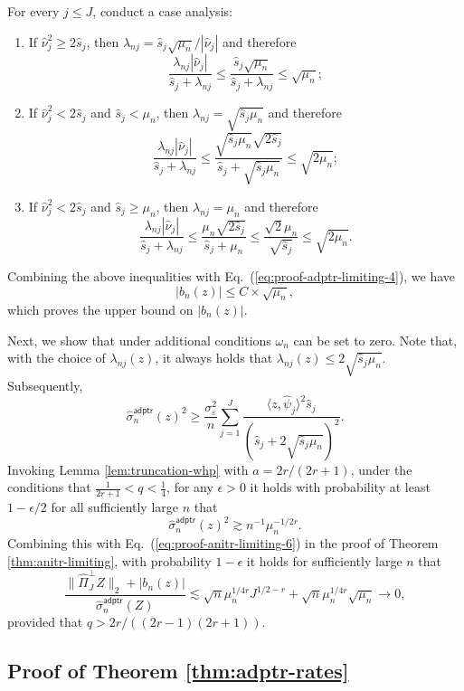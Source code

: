 \documentclass[11pt,a4paper]{article}
\renewcommand{\hat}{\widehat}
\theoremstyle{definition}
\theoremstyle{plain}
\theoremstyle{remark}
\newcommand{\adptr}{\mathsf{adptr}}
\begin{document}
For every $j\leq J$, conduct a case analysis: 
\begin{enumerate}
\item If $\hat\nu_j^2\geq 2\hat s_j$, then $\lambda_{nj}=\hat s_j\sqrt{\mu_n}/|\hat\nu_j|$ and therefore
$$
\frac{\lambda_{nj}|\hat\nu_j|}{\hat s_j+\lambda_{nj}}\leq \frac{\hat s_j\sqrt{\mu_n}}{\hat s_j+\lambda_{nj}}\leq \sqrt{\mu_n};
$$
\item If $\hat\nu_j^2< 2\hat s_j$ and $\hat s_j<{\mu_n}$, then $\lambda_{nj}=\sqrt{\hat s_j\mu_n}$ and therefore
$$
\frac{\lambda_{nj}|\hat\nu_j|}{\hat s_j+\lambda_{nj}} \leq \frac{\sqrt{\hat s_j\mu_n}\sqrt{2\hat s_j}}{\hat s_j+\sqrt{\hat s_j\mu_n}}\leq \sqrt{2\mu_n};
$$
\item If $\hat\nu_j^2<2\hat s_j$ and $\hat s_j\geq{\mu_n}$, then $\lambda_{nj}=\mu_n$ and therefore
$$
\frac{\lambda_{nj}|\hat\nu_j|}{\hat s_j+\lambda_{nj}}\leq \frac{\mu_n\sqrt{2\hat s_j}}{\hat s_j+\mu_n}\leq \frac{\sqrt{2}{\mu_n}}{\sqrt{\hat s_j}}\leq \sqrt{2\mu_n}.
$$
\end{enumerate}
Combining the above inequalities with Eq.~(\ref{eq:proof-adptr-limiting-4}), we have
$$
\big|b_n(z)\big| \leq C\times  \sqrt{\mu_n},
$$
which proves the upper bound on $|b_n(z)|$.

Next, we show that under additional conditions $\omega_n$ can be set to zero. Note that, with the choice of $\lambda_{nj}(z)$, it always holds that $\lambda_{nj}(z)\leq 2\sqrt{\hat s_j\mu_n}$.
Subsequently,
$$
\hat\sigma_n^\adptr(z)^2 \geq \frac{\sigma_\varepsilon^2}{n}\sum_{j=1}^J \frac{\langle z,\hat\psi_j\rangle^2\hat s_j}{(\hat s_j+2\sqrt{\hat s_j\mu_n})^2}.
$$
Invoking Lemma \ref{lem:truncation-whp} with $a=2r/(2r+1)$, under the conditions that $\frac{1}{2r+1}<q<\frac{1}{4}$, for any $\epsilon>0$ it holds with probability at least $1-\epsilon/2$ for all sufficiently large $n$ that
$$
\hat\sigma_n^\adptr(z)^2 \gtrsim n^{-1}\mu_n^{-1/2r}.
$$
Combining this with Eq.~(\ref{eq:proof-anitr-limiting-6}) in the proof of Theorem \ref{thm:anitr-limiting}, with probability $1-\epsilon$ it holds for sufficiently large $n$ that
$$
\frac{\|\hat\Pi_J^\perp Z\|_2+|b_n(z)|}{\hat\sigma_n^\adptr(Z)} \lesssim \sqrt{n}\mu_n^{1/4r}J^{1/2-r} + \sqrt{n}\mu_n^{1/4r}\sqrt{\mu_n} \to 0,
$$
provided that $q>2r/((2r-1)(2r+1))$.



\subsection{Proof of Theorem \ref{thm:adptr-rates}}
\end{document}

